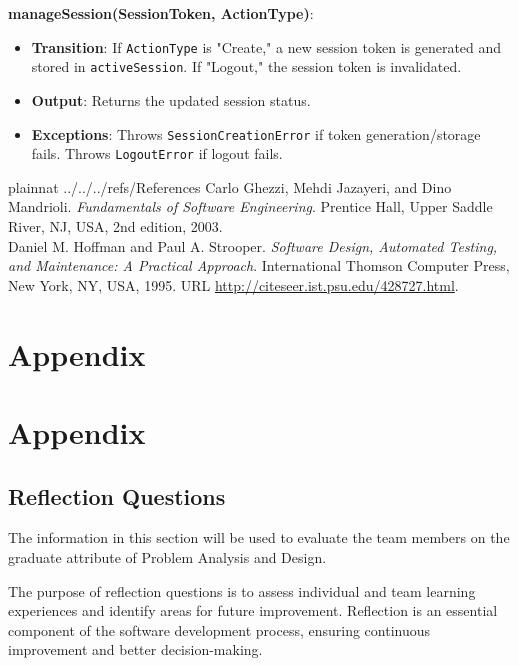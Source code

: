 \documentclass[12pt, titlepage]{article}
\begin{document}
\textbf{manageSession(SessionToken, ActionType)}:
\begin{itemize}
    \item \textbf{Transition}: If \texttt{ActionType} is "Create," a new session token is generated and stored in \texttt{activeSession}. If "Logout," the session token is invalidated.
    \item \textbf{Output}: Returns the updated session status.
    \item \textbf{Exceptions}: Throws \texttt{SessionCreationError} if token generation/storage fails. Throws \texttt{LogoutError} if logout fails.
\end{itemize}






 {plainnat}
 {../../../refs/References}
Carlo Ghezzi, Mehdi Jazayeri, and Dino Mandrioli. \textit{Fundamentals of Software Engineering}. 
Prentice Hall, Upper Saddle River, NJ, USA, 2nd edition, 2003.\\

Daniel M. Hoffman and Paul A. Strooper. \textit{Software Design, Automated Testing, and Maintenance: A Practical Approach}. 
International Thomson Computer Press, New York, NY, USA, 1995. URL \url{http://citeseer.ist.psu.edu/428727.html}.



\newpage

\section{Appendix} \label{Appendix}


\newpage{}

\section{Appendix}

\subsection{Reflection Questions}

The information in this section will be used to evaluate the team members on the graduate attribute of Problem Analysis and Design.

The purpose of reflection questions is to assess individual and team learning experiences and identify areas for future improvement. Reflection is an essential component of the software development process, ensuring continuous improvement and better decision-making.
\end{document}
